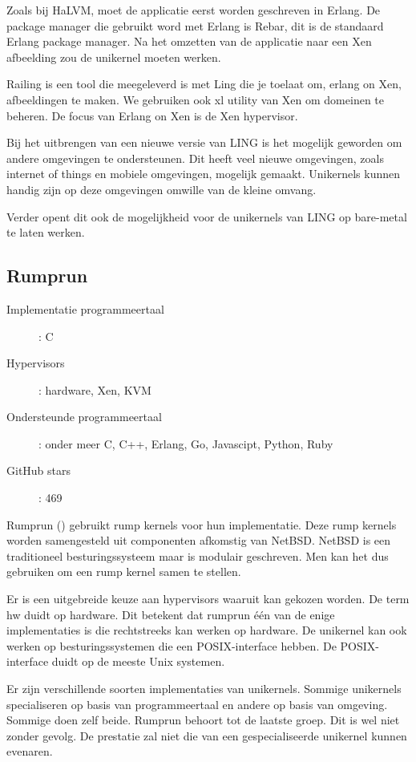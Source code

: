Zoals bij HaLVM, moet de applicatie eerst worden geschreven in Erlang. De package manager die gebruikt word met Erlang is Rebar, dit is de standaard Erlang package manager. Na het omzetten van de applicatie naar een Xen afbeelding zou de unikernel moeten werken.

Railing is een tool die meegeleverd is met Ling die je toelaat om, erlang on Xen, afbeeldingen te maken. We gebruiken ook xl utility van Xen om domeinen te beheren.
De focus van Erlang on Xen is de Xen hypervisor. 

Bij het uitbrengen van een nieuwe versie van LING is het mogelijk geworden om andere omgevingen te ondersteunen. Dit heeft veel nieuwe omgevingen, zoals internet of things en mobiele omgevingen, mogelijk gemaakt.
Unikernels kunnen handig zijn op deze omgevingen omwille van de kleine omvang. 

Verder opent dit ook de mogelijkheid voor de unikernels van LING op bare-metal te laten werken.

\subsection{Rumprun}

\begin{description}
  \item [Implementatie programmeertaal]: C
  \item [Hypervisors]: hardware, Xen, KVM
  \item [Ondersteunde programmeertaal]: onder meer C, C++, Erlang, Go, Javascipt, Python, Ruby
  \item [GitHub stars]: 469
\end{description}

Rumprun  (\cite{_rumpkernel/rumprun_????}) gebruikt rump kernels voor hun implementatie. Deze rump kernels worden samengesteld uit componenten afkomstig van NetBSD. NetBSD is een traditioneel besturingssysteem maar is modulair geschreven. Men kan het dus gebruiken om een rump kernel samen te stellen.

Er is een uitgebreide keuze aan hypervisors waaruit kan gekozen worden. De term hw duidt op hardware. Dit betekent dat rumprun één van de enige implementaties is die rechtstreeks kan werken op hardware. De unikernel kan ook werken op besturingssystemen die een POSIX-interface hebben. De POSIX-interface duidt op de meeste Unix systemen.

Er zijn verschillende soorten implementaties van unikernels. Sommige unikernels specialiseren op basis van programmeertaal en andere op basis van omgeving. Sommige doen zelf beide. Rumprun behoort tot de laatste groep. Dit is wel niet zonder gevolg. De prestatie zal niet die van een gespecialiseerde unikernel kunnen evenaren.


